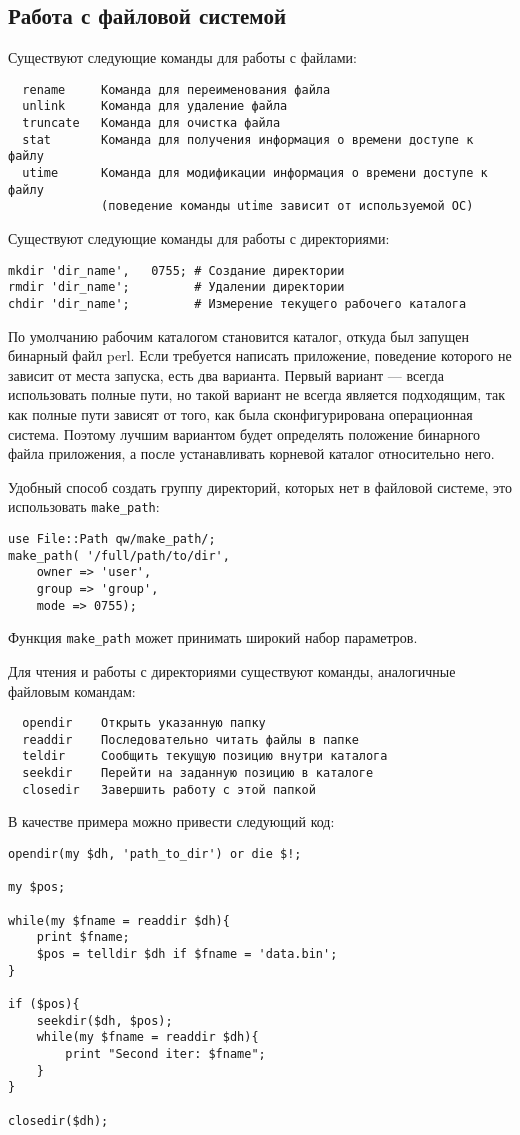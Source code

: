 \subsection{Работа с файловой системой}
Существуют следующие команды для работы с файлами:
\begin{verbatim}
  rename     Команда для переименования файла
  unlink     Команда для удаление файла
  truncate   Команда для очистка файла
  stat       Команда для получения информация о времени доступе к файлу
  utime      Команда для модификации информация о времени доступе к файлу
             (поведение команды utime зависит от используемой ОС)
\end{verbatim}

Существуют следующие команды для работы с директориями:
\begin{verbatim}
mkdir 'dir_name',   0755; # Создание директории
rmdir 'dir_name';         # Удалении директории
chdir 'dir_name';         # Измерение текущего рабочего каталога
\end{verbatim}
По умолчанию рабочим каталогом становится каталог, откуда был запущен бинарный файл perl. Если требуется написать приложение, поведение которого не зависит от места запуска, есть два варианта. Первый вариант --- всегда использовать полные пути, но такой вариант не всегда является подходящим, так как полные пути зависят от того, как была сконфигурирована операционная система. Поэтому лучшим вариантом будет определять положение бинарного файла приложения, а после устанавливать корневой каталог относительно него.

Удобный способ создать группу директорий, которых нет в файловой системе, это использовать \verb|make_path|:
\begin{verbatim}
use File::Path qw/make_path/;
make_path( '/full/path/to/dir',
    owner => 'user',
    group => 'group',
    mode => 0755);
\end{verbatim}
Функция \verb|make_path| может принимать широкий набор параметров.

Для чтения и работы с директориями существуют команды, аналогичные файловым командам:
\begin{verbatim}
  opendir    Открыть указанную папку
  readdir    Последовательно читать файлы в папке
  teldir     Сообщить текущую позицию внутри каталога
  seekdir    Перейти на заданную позицию в каталоге
  closedir   Завершить работу с этой папкой
\end{verbatim}
В качестве примера можно привести следующий код:
\begin{verbatim}
opendir(my $dh, 'path_to_dir') or die $!;

my $pos;

while(my $fname = readdir $dh){
    print $fname;
    $pos = telldir $dh if $fname = 'data.bin';
}

if ($pos){
    seekdir($dh, $pos);
    while(my $fname = readdir $dh){
        print "Second iter: $fname";
    }
}

closedir($dh);
\end{verbatim}


